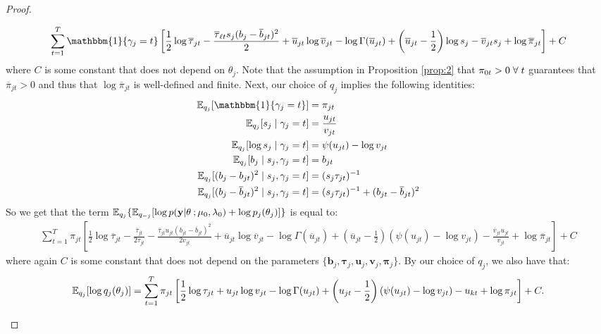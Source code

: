 \begin{proof}
\begin{enumerate}[label=\roman*.]
\begin{align*}
     \sum_{t=1}^T \mathbbm{1}\{\gamma_j = t\}\left[ \frac{1}{2} \log \overline{\tau}_{j t} - \frac{\overline{\tau}_{\ell t}s_j(b_j - \overline{b}_{jt})^2}{2} + \overline{u}_{jt} \log \overline{v}_{jt} -  \log\Gamma(\overline{u}_{jt}) + \left(\overline{u}_{jt} -\frac{1}{2}\right)\log s_j  - \overline{v}_{jt} s_j + \log \overline{\pi}_{jt}\right] + C
\end{align*}
\normalsize
where $C$ is some constant that does not depend on $\theta_j$. Note that the assumption in Proposition \ref{prop:2} that $\pi_{0t} > 0 \;\forall\; t$ guarantees that $\overline{\pi}_{jt} > 0$ and thus that $\log \overline{\pi}_{jt}$ is well-defined and finite. Next, our choice of $q_j$ implies the following identities:
\begin{align*}
    \E_{q_j}[\mathbbm{1}\{\gamma_j = t\}] &= \pi_{jt} \\
    \E_{q_j}[s_j\;|\;\gamma_j=t] &= \frac{u_{jt}}{v_{jt}} \\
    \E_{q_j}[\log s_j\;|\;\gamma_j=t] &= \psi(u_{jt}) - \log v_{jt} \\
    \E_{q_j}[b_j\;|\;s_j,\gamma_j=t] &= b_{jt} \\
    \E_{q_j}[(b_j - b_{jt})^2 \;|\;s_j,\gamma_j=t] &= (s_j \tau_{jt})^{-1} \\
    \E_{q_j}[(b_j - \overline{b}_{jt})^2 \;|\;s_j,\gamma_j=t] &= (s_j \tau_{jt})^{-1} + (b_{jt} - \overline{b}_{jt})^2
\end{align*}
So we get that the term $\mathbb{E}_{q_j}\{\mathbb{E}_{q_{-j}}[\log p(\mathbf{y}| \theta\:; \mu_0,\lambda_0)+\log p_j(\theta_j)]\}$ is equal to:
\scriptsize
\begin{align*}
    \sum_{t=1}^T \pi_{jt}\left[\frac{1}{2}\log \overline{\tau}_{j t} - \frac{\overline{\tau}_{j t}}{2\tau_{j t}}- \frac{\overline{\tau}_{j t}u_{jt}(b_{j t}  - \overline{b}_{j t})^2}{2v_{jt}} + \overline{u}_{jt} \log \overline{v}_{jt} -  \log\Gamma(\overline{u}_{jt}) + \left(\overline{u}_{jt} -\frac{1}{2}\right)(\psi(u_{jt}) - \log v_{jt}) - \frac{\overline{v}_{jt} u_{jt}}{v_{jt}} + \log \overline{\pi}_{jt}\right] + C
\end{align*}
\normalsize
where again $C$ is some constant that does not depend on the parameters $\{\mathbf{b}_j, \boldsymbol{\tau}_j, \mathbf{u}_j, \mathbf{v}_j, \boldsymbol{\pi}_j\}$. By our choice of $q_j$, we also have that:
\small
\begin{align*}
    \E_{q_j}[\log q_j(\theta_j)] = \sum_{t=1}^T \pi_{jt}\left[ \frac{1}{2}\log \tau_{jt} + u_{jt} \log v_{jt} -  \log\Gamma(u_{jt}) + \left(u_{jt} -\frac{1}{2}\right)(\psi(u_{jt}) - \log v_{jt}) - u_{kt} + \log \pi_{jt}\right] + C.

\end{align*}
\end{enumerate}
\end{proof}
